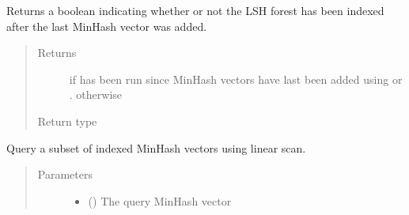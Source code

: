 \documentclass[letterpaper,10pt,english]{sphinxmanual}
\begin{document}
\begin{fulllineitems}

\begin{fulllineitems}
\label{\detokenize{documentation:tmap.LSHForest.is_clean}}
Returns a boolean indicating whether or not the LSH forest has been indexed after the last MinHash vector was added.
\begin{quote}\begin{description}
\item[{Returns}] \leavevmode
{} if {\hyperref[\detokenize{documentation:tmap.LSHForest.index}]{}} has been run since MinHash vectors have last been added using {\hyperref[\detokenize{documentation:tmap.LSHForest.add}]{}} or {\hyperref[\detokenize{documentation:tmap.LSHForest.batch_add}]{}}.  otherwise

\item[{Return type}] \leavevmode
{}

\end{description}\end{quote}

\end{fulllineitems}


\begin{fulllineitems}
\label{\detokenize{documentation:tmap.LSHForest.linear_scan}}
Query a subset of indexed MinHash vectors using linear scan.
\begin{quote}\begin{description}
\item[{Parameters}] \leavevmode\begin{itemize}
\item {} 
 () \textendash{} The query MinHash vector


\end{itemize}
\end{description}
\end{quote}
\end{fulllineitems}
\end{fulllineitems}
\end{document}
